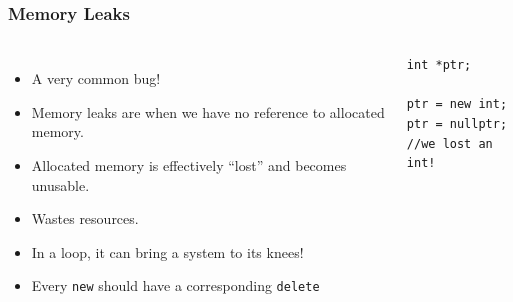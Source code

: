 \documentclass{beamer}
\begin{document}
\begin{frame}[fragile]
    \frametitle{Memory Leaks}
    \begin{columns}
        \begin{itemize}
            \item A very common bug!
            \item Memory leaks are when we have no reference to allocated
                memory.
            \item Allocated memory is effectively ``lost'' and becomes unusable.
            \item Wastes resources.
            \item In a loop, it can bring a system to its knees!
            \item Every {\tt new} should have a corresponding {\tt delete}
        \end{itemize}
        \begin{verbatim}
int *ptr;

ptr = new int;
ptr = nullptr;
//we lost an int!
        \end{verbatim}
    \end{columns}
\end{frame}
\end{document}
